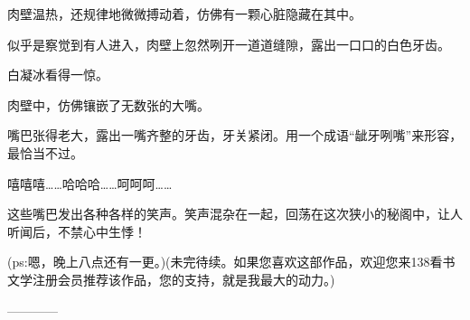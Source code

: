 \begin{this_body}
肉壁温热，还规律地微微搏动着，仿佛有一颗心脏隐藏在其中。

似乎是察觉到有人进入，肉壁上忽然咧开一道道缝隙，露出一口口的白色牙齿。

白凝冰看得一惊。

肉壁中，仿佛镶嵌了无数张的大嘴。

嘴巴张得老大，露出一嘴齐整的牙齿，牙关紧闭。用一个成语“龇牙咧嘴”来形容，最恰当不过。

嘻嘻嘻……哈哈哈……呵呵呵……

这些嘴巴发出各种各样的笑声。笑声混杂在一起，回荡在这次狭小的秘阁中，让人听闻后，不禁心中生悸！

(ps:嗯，晚上八点还有一更。)(未完待续。如果您喜欢这部作品，欢迎您来138看书文学注册会员推荐该作品，您的支持，就是我最大的动力。)

------------

\end{this_body}

